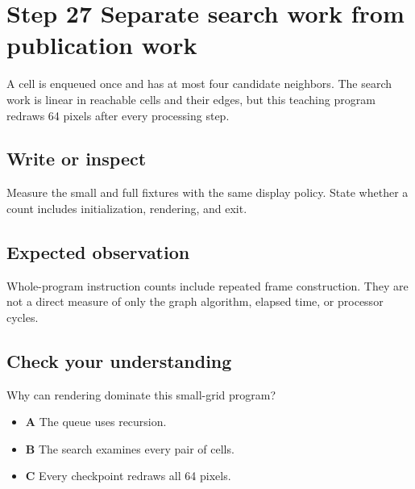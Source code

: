 \section{Step 27 Separate search work from publication work}\label{maze-s27}

A cell is enqueued once and has at most four candidate neighbors. The search work is linear in reachable cells and their edges, but this teaching program redraws 64 pixels after every processing step.

\subsection{Write or inspect}

Measure the small and full fixtures with the same display policy. State whether a count includes initialization, rendering, and exit.

\subsection{Expected observation}

Whole-program instruction counts include repeated frame construction. They are not a direct measure of only the graph algorithm, elapsed time, or processor cycles.

\subsection{Check your understanding}

Why can rendering dominate this small-grid program?

\begin{itemize}
  \item \textbf{A} The queue uses recursion.
  \item \textbf{B} The search examines every pair of cells.
  \item \textbf{C} Every checkpoint redraws all 64 pixels.
\end{itemize}
